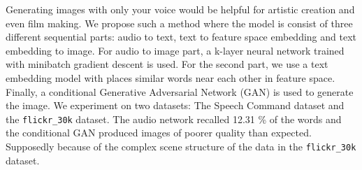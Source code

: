 \documentclass[../main.tex]{subfiles}
\begin{document}
Generating images with only your voice would be helpful for artistic creation and even film making. We propose such a method where the model is consist of three different sequential parts: audio to text, text to feature space embedding and text embedding to image. For audio to image part, a k-layer neural network trained with minibatch gradient descent is used. For the second part, we use a text embedding model with places similar words near each other in feature space. Finally, a conditional Generative Adversarial Network (GAN) is used to generate the image. We experiment on two datasets: The Speech Command dataset and the 
\texttt{flickr\_30k} dataset. The audio network recalled 12.31 \% of the words and the conditional GAN produced images of poorer quality than expected. Supposedly because of the complex scene structure of the data in the \texttt{flickr\_30k} dataset.
\end{document}
